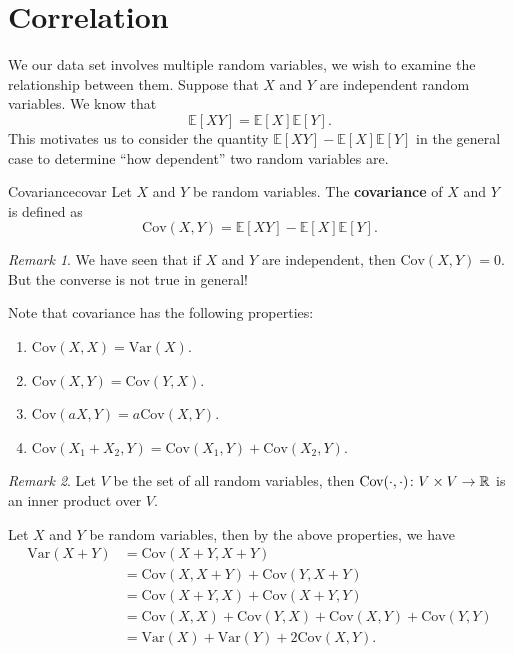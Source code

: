 \documentclass[math]{amznotes}
\theoremstyle{remark}
\newtheorem*{remark}{Remark}
\newcommand{\0}{\mathbf{0}}
\newcommand{\1}{\mathbf{1}}
\begin{document}
\section{Correlation}
We our data set involves multiple random variables, we wish to examine the relationship between them. Suppose that $X$ and $Y$ are independent random variables. We know that
\begin{equation*}
    \mathbb{E}[XY] = \mathbb{E}[X]\mathbb{E}[Y].
\end{equation*}
This motivates us to consider the quantity $\mathbb{E}[XY] - \mathbb{E}[X]\mathbb{E}[Y]$ in the general case to determine ``how dependent'' two random variables are.
\begin{dfnbox}{Covariance}{covar}
    Let $X$ and $Y$ be random variables. The {\color{red} \textbf{covariance}} of $X$ and $Y$ is defined as
    \begin{equation*}
        \mathrm{Cov}(X, Y) = \mathbb{E}[XY] - \mathbb{E}[X]\mathbb{E}[Y].
    \end{equation*}
\end{dfnbox}
\begin{notebox}
    \begin{remark}
        We have seen that if $X$ and $Y$ are independent, then $\mathrm{Cov}(X, Y) = 0$. But the converse is not true in general!
    \end{remark}
\end{notebox}
Note that covariance has the following properties:
\begin{enumerate}
    \item $\mathrm{Cov}(X, X) = \mathrm{Var}(X)$.
    \item $\mathrm{Cov}(X, Y) = \mathrm{Cov}(Y, X)$.
    \item $\mathrm{Cov}(aX, Y) = a\mathrm{Cov}(X, Y)$.
    \item $\mathrm{Cov}(X_1 + X_2, Y) = \mathrm{Cov}(X_1, Y) + \mathrm{Cov}(X_2, Y)$.
\end{enumerate}
\begin{notebox}
    \begin{remark}
        Let $V$ be the set of all random variables, then $\mathrm{Cov}(\cdot, \cdot) \colon V \times V \to \mathbb{R}$ is an inner product over $V$.
    \end{remark}
\end{notebox}
Let $X$ and $Y$ be random variables, then by the above properties, we have
\begin{align*}
    \mathrm{Var}(X + Y) & = \mathrm{Cov}(X + Y, X + Y) \\
    & = \mathrm{Cov}(X, X + Y) + \mathrm{Cov}(Y, X + Y) \\
    & = \mathrm{Cov}(X + Y, X) + \mathrm{Cov}(X + Y, Y) \\
    & = \mathrm{Cov}(X, X) + \mathrm{Cov}(Y, X) + \mathrm{Cov}(X, Y) + \mathrm{Cov}(Y, Y) \\
    & = \mathrm{Var}(X) + \mathrm{Var}(Y) + 2\mathrm{Cov}(X, Y).
\end{align*}
\end{document}
